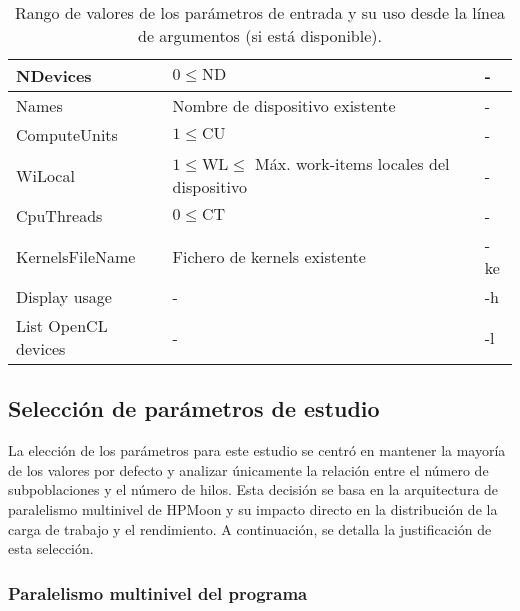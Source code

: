 \begin{table}[htbp]
\begin{tabular}{|p{3cm}|p{6cm}|p{2.2cm}|}
        NDevices            & $0 \leq \mathrm{ND}$                                                    & -                   \\ \hline
        Names               & Nombre de dispositivo existente                                         & -                   \\ \hline
        ComputeUnits        & $1 \leq \mathrm{CU}$                                                    & -                   \\ \hline
        WiLocal             & $1 \leq \mathrm{WL} \leq$ Máx. work-items locales del dispositivo       & -                   \\ \hline
        CpuThreads          & $0 \leq \mathrm{CT}$                                                    & -                   \\ \hline
        KernelsFileName     & Fichero de kernels existente                                            & -ke                 \\ \hline
        Display usage       & -                                                                       & -h                  \\ \hline
        List OpenCL devices & -                                                                       & -l                  \\ \hline
    \end{tabular}
    \caption{Rango de valores de los parámetros de entrada y su uso desde la línea de argumentos (si está disponible).}
    \label{tab:hpmoon_parametros}
\end{table}

\subsection{Selección de parámetros de estudio}

La elección de los parámetros para este estudio se centró en mantener la mayoría de los valores por defecto y analizar únicamente la relación entre el número de subpoblaciones y el número de hilos. Esta decisión se basa en la arquitectura de paralelismo multinivel de HPMoon y su impacto directo en la distribución de la carga de trabajo y el rendimiento. A continuación, se detalla la justificación de esta selección.

\subsubsection{Paralelismo multinivel del programa}

